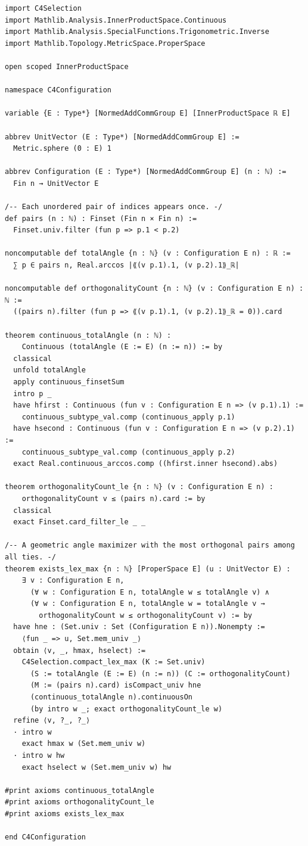 \documentclass[11pt,a4paper]{article}
\begin{document}
\begin{Verbatim}[breaklines,breakanywhere,fontsize=\footnotesize]
import C4Selection
import Mathlib.Analysis.InnerProductSpace.Continuous
import Mathlib.Analysis.SpecialFunctions.Trigonometric.Inverse
import Mathlib.Topology.MetricSpace.ProperSpace

open scoped InnerProductSpace

namespace C4Configuration

variable {E : Type*} [NormedAddCommGroup E] [InnerProductSpace ℝ E]

abbrev UnitVector (E : Type*) [NormedAddCommGroup E] :=
  Metric.sphere (0 : E) 1

abbrev Configuration (E : Type*) [NormedAddCommGroup E] (n : ℕ) :=
  Fin n → UnitVector E

/-- Each unordered pair of indices appears once. -/
def pairs (n : ℕ) : Finset (Fin n × Fin n) :=
  Finset.univ.filter (fun p => p.1 < p.2)

noncomputable def totalAngle {n : ℕ} (v : Configuration E n) : ℝ :=
  ∑ p ∈ pairs n, Real.arccos |⟪(v p.1).1, (v p.2).1⟫_ℝ|

noncomputable def orthogonalityCount {n : ℕ} (v : Configuration E n) : ℕ :=
  ((pairs n).filter (fun p => ⟪(v p.1).1, (v p.2).1⟫_ℝ = 0)).card

theorem continuous_totalAngle (n : ℕ) :
    Continuous (totalAngle (E := E) (n := n)) := by
  classical
  unfold totalAngle
  apply continuous_finsetSum
  intro p _
  have hfirst : Continuous (fun v : Configuration E n => (v p.1).1) :=
    continuous_subtype_val.comp (continuous_apply p.1)
  have hsecond : Continuous (fun v : Configuration E n => (v p.2).1) :=
    continuous_subtype_val.comp (continuous_apply p.2)
  exact Real.continuous_arccos.comp ((hfirst.inner hsecond).abs)

theorem orthogonalityCount_le {n : ℕ} (v : Configuration E n) :
    orthogonalityCount v ≤ (pairs n).card := by
  classical
  exact Finset.card_filter_le _ _

/-- A geometric angle maximizer with the most orthogonal pairs among all ties. -/
theorem exists_lex_max {n : ℕ} [ProperSpace E] (u : UnitVector E) :
    ∃ v : Configuration E n,
      (∀ w : Configuration E n, totalAngle w ≤ totalAngle v) ∧
      (∀ w : Configuration E n, totalAngle w = totalAngle v →
        orthogonalityCount w ≤ orthogonalityCount v) := by
  have hne : (Set.univ : Set (Configuration E n)).Nonempty :=
    ⟨fun _ => u, Set.mem_univ _⟩
  obtain ⟨v, _, hmax, hselect⟩ :=
    C4Selection.compact_lex_max (K := Set.univ)
      (S := totalAngle (E := E) (n := n)) (C := orthogonalityCount)
      (M := (pairs n).card) isCompact_univ hne
      (continuous_totalAngle n).continuousOn
      (by intro w _; exact orthogonalityCount_le w)
  refine ⟨v, ?_, ?_⟩
  · intro w
    exact hmax w (Set.mem_univ w)
  · intro w hw
    exact hselect w (Set.mem_univ w) hw

#print axioms continuous_totalAngle
#print axioms orthogonalityCount_le
#print axioms exists_lex_max

end C4Configuration
\end{Verbatim}
\end{document}
